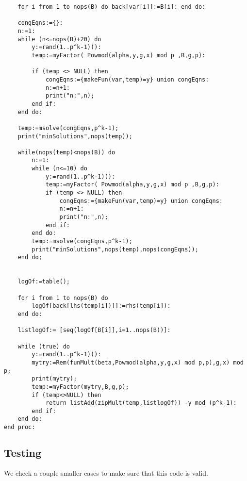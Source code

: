 \documentclass[article,oneside]{memoir}
\begin{document}
\begin{verbatim}
    for i from 1 to nops(B) do back[var[i]]:=B[i]: end do:

    congEqns:={}:
    n:=1:
    while (n<=nops(B)+20) do
        y:=rand(1..p^k-1)():
        temp:=myFactor( Powmod(alpha,y,g,x) mod p ,B,g,p):

        if (temp <> NULL) then
            congEqns:={makeFun(var,temp)=y} union congEqns:
            n:=n+1:
            print("n:",n);
        end if:
    end do:

    temp:=msolve(congEqns,p^k-1);
    print("minSolutions",nops(temp));

    while(nops(temp)<nops(B)) do
        n:=1:
        while (n<=10) do
            y:=rand(1..p^k-1)():
            temp:=myFactor( Powmod(alpha,y,g,x) mod p ,B,g,p):
            if (temp <> NULL) then
                congEqns:={makeFun(var,temp)=y} union congEqns:
                n:=n+1:
                print("n:",n);
            end if:
        end do:
        temp:=msolve(congEqns,p^k-1);
        print("minSolutions",nops(temp),nops(congEqns));
    end do;
   

    logOf:=table();

    for i from 1 to nops(B) do 
        logOf[back[lhs(temp[i])]]:=rhs(temp[i]):	
    end do:
    
    listlogOf:= [seq(logOf[B[i]],i=1..nops(B))]:
    
    while (true) do
        y:=rand(1..p^k-1)():
        mytry:=Rem(funMult(beta,Powmod(alpha,y,g,x) mod p,p),g,x) mod p;
        print(mytry);
        temp:=myFactor(mytry,B,g,p);
        if (temp<>NULL) then
            return listAdd(zipMult(temp,listlogOf)) -y mod (p^k-1):
        end if:
    end do:
end proc:
\end{verbatim}

\subsection*{Testing}
We check a couple smaller cases to make sure that this code is valid.
\end{document}
